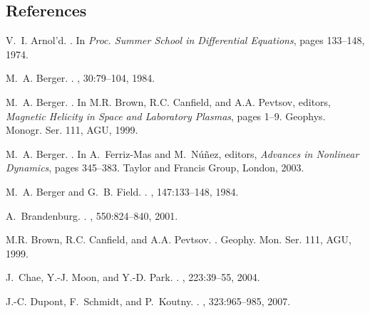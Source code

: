 \begin{frontmatter}
\chapter*{References}
\end{frontmatter}

\begin{thebibliography}{10}

V.~I. {Arnol'd}.
.
\newblock In {\em Proc. Summer School in Differential Equations}, pages
  133--148, 1974.

M.~A. {Berger}.
.
, 30:79--104, 1984.

M.~A. {Berger}.
.
\newblock In M.R. {Brown}, R.C. {Canfield}, and A.A. {Pevtsov}, editors, {\em
  Magnetic Helicity in Space and Laboratory Plasmas}, pages 1--9. Geophys.
  Monogr. Ser. 111, AGU, 1999.

M.~A. {Berger}.
.
\newblock In A.~{Ferriz-Mas} and M.~{N{\'u}{\~n}ez}, editors, {\em Advances in
  Nonlinear Dynamics}, pages 345--383. Taylor and Francis Group, London, 2003.

M.~A. {Berger} and G.~B. {Field}.
.
, 147:133--148, 1984.

A.~{Brandenburg}.
.
, 550:824--840, 2001.

M.R. {Brown}, R.C. {Canfield}, and A.A. {Pevtsov}.
.
\newblock Geophy. Mon. Ser. 111, AGU, 1999.

J.~{Chae}, Y.-J. {Moon}, and Y.-D. {Park}.
.
, 223:39--55, 2004.

J.-C. {Dupont}, F.~{Schmidt}, and P.~{Koutny}.
.
, 323:965--985, 2007.


\end{thebibliography}
